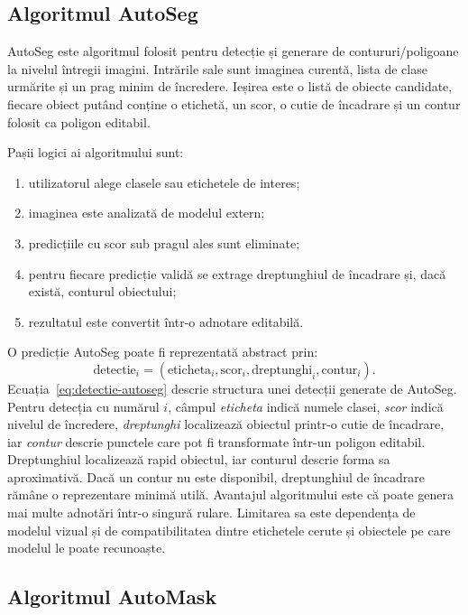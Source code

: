 \subsection{Algoritmul AutoSeg}
\label{subsec:algoritm-autoseg}

AutoSeg este algoritmul folosit pentru detecție și generare de contururi/poligoane la nivelul întregii imagini.
Intrările sale sunt imaginea curentă, lista de clase urmărite și un prag minim de încredere.
Ieșirea este o listă de obiecte candidate, fiecare obiect putând conține o etichetă, un scor, o cutie de încadrare și un contur folosit ca poligon editabil.

Pașii logici ai algoritmului sunt:
\begin{enumerate}
    \item utilizatorul alege clasele sau etichetele de interes;
    \item imaginea este analizată de modelul extern;
    \item predicțiile cu scor sub pragul ales sunt eliminate;
    \item pentru fiecare predicție validă se extrage dreptunghiul de încadrare și, dacă există, conturul obiectului;
    \item rezultatul este convertit într-o adnotare editabilă.
\end{enumerate}

O predicție AutoSeg poate fi reprezentată abstract prin:
\begin{equation}
    \text{detectie}_i =
    (\text{eticheta}_i, \text{scor}_i, \text{dreptunghi}_i, \text{contur}_i).
    \label{eq:detectie-autoseg}
\end{equation}
Ecuația~\ref{eq:detectie-autoseg} descrie structura unei detecții generate de AutoSeg. Pentru detecția cu numărul $i$, câmpul \textit{eticheta} indică numele clasei, \textit{scor} indică nivelul de încredere, \textit{dreptunghi} localizează obiectul printr-o cutie de încadrare, iar \textit{contur} descrie punctele care pot fi transformate într-un poligon editabil.
Dreptunghiul localizează rapid obiectul, iar conturul descrie forma sa aproximativă.
Dacă un contur nu este disponibil, dreptunghiul de încadrare rămâne o reprezentare minimă utilă.
Avantajul algoritmului este că poate genera mai multe adnotări într-o singură rulare.
Limitarea sa este dependența de modelul vizual și de compatibilitatea dintre etichetele cerute și obiectele pe care modelul le poate recunoaște.

\subsection{Algoritmul AutoMask}
\label{subsec:algoritm-automask}


